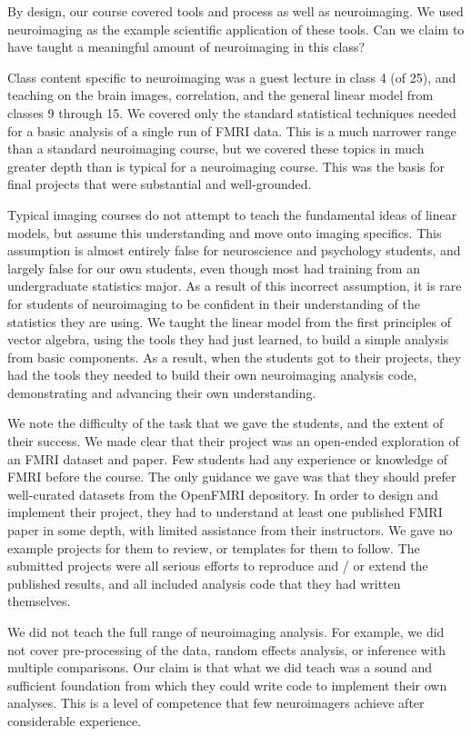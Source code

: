 By design, our course covered tools and process as well as neuroimaging.  We
used neuroimaging as the example scientific application of these tools.  Can
we claim to have taught a meaningful amount of neuroimaging in this class?

Class content specific to neuroimaging was a guest lecture in class 4 (of 25),
and teaching on the brain images, correlation, and the general linear model
from classes 9 through 15.  We covered only the standard
statistical techniques needed for a basic analysis of a single run of FMRI
data.  This is a much narrower range than a standard neuroimaging course, but
we covered these topics in much greater depth than is typical for a
neuroimaging course.  This was the basis for final projects that were
substantial and well-grounded.

Typical imaging courses do not attempt to
teach the fundamental ideas of linear models, but assume this understanding
and move onto imaging specifics.  This assumption is almost entirely false for
neuroscience and psychology students, and largely false for our own
students, even though most had training from an undergraduate
statistics major. As a result of this incorrect assumption, it is rare for
students of neuroimaging to be confident in their understanding of the
statistics they are using.  We taught the linear model from the first
principles of vector algebra, using the tools they had just learned, to build
a simple analysis from basic components.  As a result, when the students got
to their projects, they had the tools they needed to build their own
neuroimaging analysis code, demonstrating and advancing their own
understanding.

We note the difficulty of the task that we gave the students, and the
extent of their success.  We made clear that their project was an open-ended
exploration of an FMRI dataset and paper.  Few students had any
experience or knowledge of FMRI before the course. The only guidance we gave
was that they should prefer well-curated datasets from the OpenFMRI
depository.  In order to design and implement their project, they had to
understand at least one published FMRI paper in some depth, with limited
assistance from their instructors.  We gave no example projects for them to
review, or templates for them to follow.  The submitted projects were all serious efforts to reproduce and
/ or extend the published results, and all included analysis code that they
had written themselves.

We did not teach the full range of neuroimaging analysis.  For example, we did
not cover pre-processing of the data, random effects analysis, or inference
with multiple comparisons.   Our claim is that what we did teach was a sound
and sufficient foundation from which they could write code to implement their
own analyses.  This is a level of competence that few neuroimagers achieve
after considerable experience.

